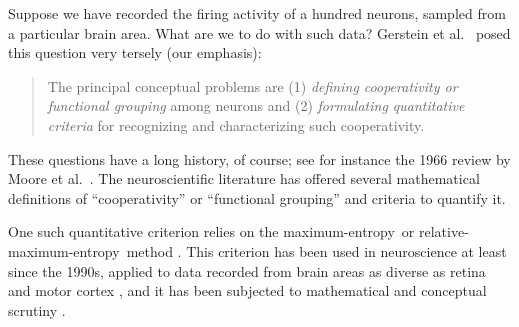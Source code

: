 \documentclass[\ifafour a4paper,12pt,\else a5paper,10pt,\fi%
onecolumn,oneside,article,%
british%
]{memoir}
\theoremstyle{remark}
\theoremstyle{innote}
\newcommand*{\citep}{\parencites}
\newcommand*{\citey}{\parencites*}
\renewcommand*{\|}{\nonscript\,\vert\nonscript\;\mathopen{}}
\newcommand*{\etal}{{et al.}}
\newcommand*{\me}{maximum-entropy}
\begin{document}
Suppose we have recorded the firing activity of a hundred neurons,
sampled from a particular brain area. What are we to do with such data?
Gerstein \etal\ \citey{gersteinetal1985} posed this question very
tersely (our emphasis):
\begin{quote}\small
  The principal conceptual problems are (1) \emph{defining cooperativity or
    functional grouping} among neurons and (2) \emph{formulating
    quantitative criteria} for recognizing and characterizing such
  cooperativity.
\end{quote}
These questions have a long history, of course; see for instance the 1966
review by Moore \etal\
\citey{mooreetal1966}. %
The neuroscientific literature has offered several mathematical definitions
of \enquote{cooperativity} or \enquote{functional grouping} and criteria to
quantify it.

One such quantitative criterion relies on the \me\ or relative-\me\ method
\citep{jaynes1957,jaynes1963,hobsonetal1973,sivia1996_r2006,meadetal1984}.
This criterion has been used in neuroscience at least since the 1990s,
applied to data recorded from brain areas as diverse as retina and motor
cortex
\citep{mackay1991,martignonetal1995,bohteetal2000,amarietal2003,schneidmanetal2006,shlensetal2006,mackeetal2009b,roudietal2009c,tkaciketal2009,gerwinnetal2009,mackeetal2011,mackeetal2011b,ganmoretal2011,granotatedgietal2013,tkaciketal2014b,moraetal2015,shimazakietal2015},
and it has been subjected to mathematical and conceptual scrutiny
\citep{tkaciketal2006,roudietal2009,roudietal2009b,barreiroetal2010,barreiroetal2010b,mackeetal2013,rostamietal2016_r2017}.
\end{document}
